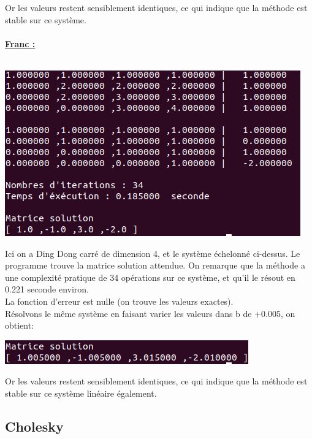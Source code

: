 \documentclass[a4paper]{article}
\begin{document}
Or les valeurs restent sensiblement identiques, ce qui indique que la méthode est stable sur ce système.
\\
\\
\textbf{\underline{\large{Franc :}}}
\\
\\
\begin{center}
	\includegraphics[scale=0.5]{./img/gauss/TestFranc.png} \\
\end{center}

Ici on a Ding Dong carré de dimension 4, et le système échelonné ci-dessus.
Le programme trouve la matrice solution attendue.
On remarque que la méthode a une complexité pratique de 34 opérations sur ce système, et qu'il le résout en 0.221 seconde environ.
\\
La fonction d'erreur est nulle (on trouve les valeurs exactes).\\
Résolvons le même système en faisant varier les valeurs dans b de +0.005, on obtient:
\\
\begin{center}
	\includegraphics[scale=0.5]{./img/gauss/franc005.png} \\
\end{center}

Or les valeurs restent sensiblement identiques, ce qui indique que la méthode
est stable sur ce système linéaire également.

\clearpage

\subsection{Cholesky}
\end{document}
